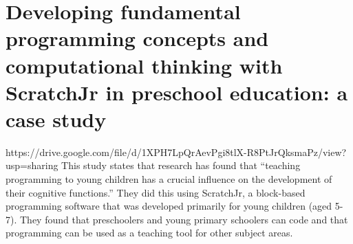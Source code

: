 \documentclass[12pt]{extarticle}
\begin{document}
\section{Developing fundamental programming concepts and computational thinking with ScratchJr in preschool education: a case study}
\author{Papadakis, Stamatios - Kalagiannakis, Michail - Zaranis, Nicholas}
https://drive.google.com/file/d/1XPH7LpQrAevPgi8tlX-R8PtJrQksmaPz/view?usp=sharing  
This study states that research has found that “teaching programming to young children has a crucial influence on the development of their cognitive functions.” They did this using ScratchJr, a block-based programming software that was developed primarily for young children (aged 5-7). They found that preschoolers and young primary schoolers can code and that programming can be used as a teaching tool for other subject areas.
\end{document}

